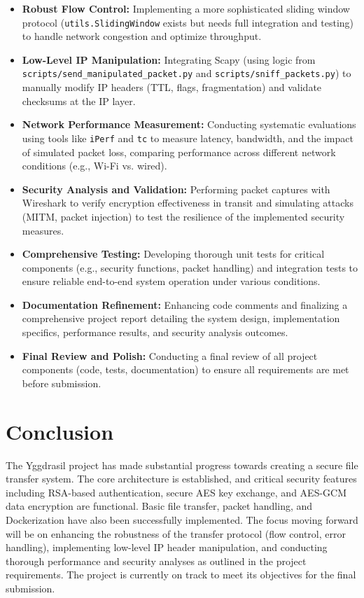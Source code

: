 \documentclass[11pt]{article}
\begin{document}
\begin{itemize}
    \item \textbf{Robust Flow Control:} Implementing a more sophisticated sliding window protocol (\texttt{utils.SlidingWindow} exists but needs full integration and testing) to handle network congestion and optimize throughput.
    \item \textbf{Low-Level IP Manipulation:} Integrating Scapy (using logic from \texttt{scripts/send\_manipulated\_packet.py} and \texttt{scripts/sniff\_packets.py}) to manually modify IP headers (TTL, flags, fragmentation) and validate checksums at the IP layer.
    \item \textbf{Network Performance Measurement:} Conducting systematic evaluations using tools like \texttt{iPerf} and \texttt{tc} to measure latency, bandwidth, and the impact of simulated packet loss, comparing performance across different network conditions (e.g., Wi-Fi vs. wired).
    \item \textbf{Security Analysis and Validation:} Performing packet captures with Wireshark to verify encryption effectiveness in transit and simulating attacks (MITM, packet injection) to test the resilience of the implemented security measures.
    \item \textbf{Comprehensive Testing:} Developing thorough unit tests for critical components (e.g., security functions, packet handling) and integration tests to ensure reliable end-to-end system operation under various conditions.
    \item \textbf{Documentation Refinement:} Enhancing code comments and finalizing a comprehensive project report detailing the system design, implementation specifics, performance results, and security analysis outcomes.
    \item \textbf{Final Review and Polish:} Conducting a final review of all project components (code, tests, documentation) to ensure all requirements are met before submission.
\end{itemize}

\section{Conclusion}
\label{sec:conclusion}
The Yggdrasil project has made substantial progress towards creating a secure file transfer system. The core architecture is established, and critical security features including RSA-based authentication, secure AES key exchange, and AES-GCM data encryption are functional. Basic file transfer, packet handling, and Dockerization have also been successfully implemented. The focus moving forward will be on enhancing the robustness of the transfer protocol (flow control, error handling), implementing low-level IP header manipulation, and conducting thorough performance and security analyses as outlined in the project requirements. The project is currently on track to meet its objectives for the final submission.



\end{document}
